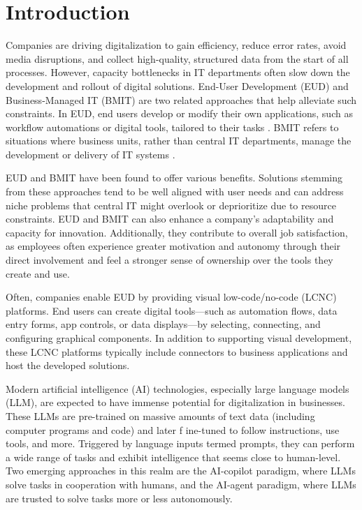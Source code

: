 \documentclass[english,anonymous]{lni}
\begin{document}
\section{Introduction}\label{sec:intro}


Companies are driving digitalization to gain efficiency, reduce error rates, avoid media disruptions, and collect high-quality, structured data  from the start of all processes. However, capacity bottlenecks in IT departments often slow down the development and rollout of digital solutions. End-User Development (EUD) and Business-Managed IT (BMIT) are two related approaches that help alleviate such constraints. In EUD, end users develop or modify their own applications, such as workflow automations or digital tools, tailored to their tasks \cite{liebermanEndUserDevelopment2006, paternoNewPerspectivesEndUser2017}. BMIT refers to situations where business units, rather than central IT departments, manage the development or delivery of IT systems \cite{kopperBusinessmanagedITConceptual2018}.

EUD and BMIT have been found to offer various benefits. Solutions stemming from these approaches tend to be well aligned with user needs and can address niche problems that central IT might overlook or deprioritize due to resource constraints. EUD and BMIT can also enhance a company’s adaptability and capacity for innovation. Additionally, they contribute to overall job satisfaction, as employees often experience greater motivation and autonomy through their direct involvement and feel a stronger sense of ownership over the tools they create and use. \cite{kopperBusinessmanagedITConceptual2018}

Often, companies enable EUD by providing visual low-code/no-code (LCNC) platforms. End users can create digital tools—such as automation flows, data entry forms, app controls, or data displays—by selecting, connecting, and configuring graphical components. In addition to supporting visual development, these LCNC platforms typically include connectors to business applications and host the developed solutions.


Modern artificial intelligence (AI) technologies, especially large language models (LLM), are expected to have immense potential for  digitalization in businesses. These LLMs are pre-trained on massive amounts of text data (including computer programs and code) and later f ine-tuned to follow instructions, use tools, and more. Triggered by language inputs termed prompts, they can perform a wide range of tasks and exhibit intelligence that seems close to human-level.
Two emerging approaches in this realm are the AI-copilot paradigm, where LLMs solve tasks in cooperation with humans, and the AI-agent paradigm, where LLMs are trusted to solve tasks more or less autonomously.
\end{document}
